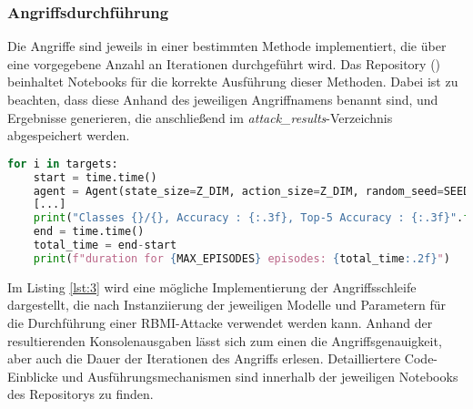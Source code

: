 \subsubsection{Angriffsdurchführung}
Die Angriffe sind jeweils in einer bestimmten Methode implementiert, die über eine vorgegebene Anzahl an Iterationen durchgeführt wird. Das Repository (\cite{weber_hosthansba_code_2024}) beinhaltet Notebooks für die korrekte Ausführung dieser Methoden. Dabei ist zu beachten, dass diese Anhand des jeweiligen Angriffnamens benannt sind, und Ergebnisse generieren, die anschließend im \textit{attack\_results}-Verzeichnis abgespeichert werden.
\begin{lstlisting}[language=Python, caption=Angriffsschleife einer RBMI-Attacke, label=lst:3]
for i in targets:
	start = time.time()
	agent = Agent(state_size=Z_DIM, action_size=Z_DIM, random_seed=SEED, hidden_size=256, action_prior="uniform")
	[...]
	print("Classes {}/{}, Accuracy : {:.3f}, Top-5 Accuracy : {:.3f}".format(total, N_TARGET, acc, acc5))
	end = time.time()
	total_time = end-start
	print(f"duration for {MAX_EPISODES} episodes: {total_time:.2f}")
\end{lstlisting}
Im Listing \ref{lst:3} wird eine mögliche Implementierung der Angriffsschleife dargestellt, die nach Instanziierung der jeweiligen Modelle und Parametern für die Durchführung einer RBMI-Attacke verwendet werden kann. Anhand der resultierenden Konsolenausgaben lässt sich zum einen die Angriffsgenauigkeit, aber auch die Dauer der Iterationen des Angriffs erlesen. Detailliertere Code-Einblicke und Ausführungsmechanismen sind innerhalb der jeweiligen Notebooks des Repositorys zu finden.